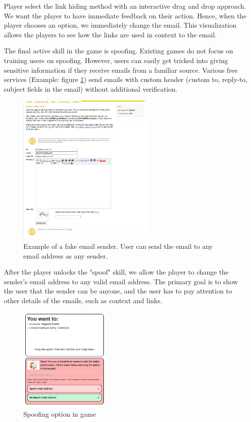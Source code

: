 Player select the link hiding method with an interactive drag and drop approach. We want the player to have immediate feedback on their action. Hence, when the player chooses an option, we immediately change the email. This visualization allows the players to see how the links are used in context to the email.

The final active skill in the game is spoofing. Existing games do not focus on training users on spoofing. However, users can easily get tricked into giving sensitive information if they receive emails from a familiar source. Various free services (Example: figure \ref{fig:spoof_sender}) send emails with custom header (custom to, reply-to, subject fields in the email) without additional verification.

\begin{figure}[ht]
    \centering
    \includegraphics[width=0.6\textwidth]{figures/section2/spoof_sender.png}
    \caption[Fake email sender]{Example of a fake email sender. User can send the email to any email address as any sender.}
    \label{fig:spoof_sender}
\end{figure}

After the player unlocks the "spoof" skill, we allow the player to change the sender's email address to any valid email address. The primary goal is to show the user that the sender can be anyone, and the user has to pay attention to other details of the emails, such as context and links.

\begin{figure}[!ht]
    \centering
    \includegraphics[width=0.4\textwidth]{figures/section2/spoofing.png}
    \caption{Spoofing option in game}
    \label{fig:spoofing}
\end{figure}


